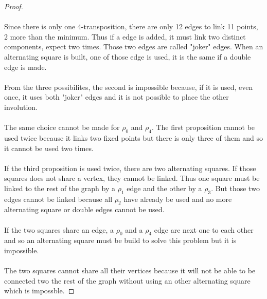 \begin{proof}
\paragraph{}
Since there is only one 4-transposition, there are only 12 edges to link 11 points, 2 more than the minimum. Thus if a edge is added, it must link two distinct components, expect two times. Those two edges are called "joker" edges. When an alternating square is built, one of those edge is used, it is the same if a double edge is made.

\paragraph{}
From the three possibilites, the second is impossible because, if it is used, even once, it uses both "joker" edges and it is not possible to place the other involution.

\paragraph{}
The same choice cannot be made for $\rho_0$ and $\rho_4$. The first proposition cannot be used twice because it links two fixed points but there is only three of them and so it cannot be used two times.

\paragraph{}
If the third proposition is used twice, there are two alternating squares. If those squares does not share a vertex, they cannot be linked. Thus one square must be linked to the rest of the graph by a $\rho_1$ edge and the other by a $\rho_3$. But those two edges cannot be linked because all $\rho_2$ have already be used and no more alternating square or double edges cannot be used.

\paragraph{}
If the two squares share an edge, a $\rho_0$ and a $\rho_4$ edge are next one to each other and so an alternating square must be build to solve this problem but it is impossible.

\paragraph{}
The two squares cannot share all their vertices because it will not be able to be connected two the rest of the graph without using an other alternating square which is impossble.


\end{proof}
